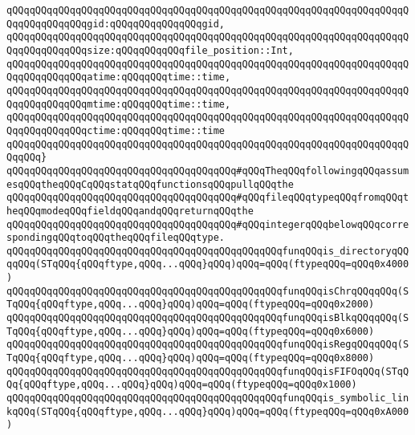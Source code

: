 \verb|qQQqqQQqqQQqqQQqqQQqqQQqqQQqqQQqqQQqqQQqqQQqqQQqqQQqqQQqqQQqqQQqqQQqqQQqqQQqqQQqqQQqgid:qQQqqQQqqQQqqQQqgid,|\newline
\verb|qQQqqQQqqQQqqQQqqQQqqQQqqQQqqQQqqQQqqQQqqQQqqQQqqQQqqQQqqQQqqQQqqQQqqQQqqQQqqQQqqQQqsize:qQQqqQQqqQQqfile_position::Int,|\newline
\verb|qQQqqQQqqQQqqQQqqQQqqQQqqQQqqQQqqQQqqQQqqQQqqQQqqQQqqQQqqQQqqQQqqQQqqQQqqQQqqQQqqQQqatime:qQQqqQQqtime::time,|\newline
\verb|qQQqqQQqqQQqqQQqqQQqqQQqqQQqqQQqqQQqqQQqqQQqqQQqqQQqqQQqqQQqqQQqqQQqqQQqqQQqqQQqqQQqmtime:qQQqqQQqtime::time,|\newline
\verb|qQQqqQQqqQQqqQQqqQQqqQQqqQQqqQQqqQQqqQQqqQQqqQQqqQQqqQQqqQQqqQQqqQQqqQQqqQQqqQQqqQQqctime:qQQqqQQqtime::time|\newline
\verb|qQQqqQQqqQQqqQQqqQQqqQQqqQQqqQQqqQQqqQQqqQQqqQQqqQQqqQQqqQQqqQQqqQQqqQQqqQQq}|\newline
\verb|qQQqqQQqqQQqqQQqqQQqqQQqqQQqqQQqqQQqqQQq#qQQqTheqQQqfollowingqQQqassumesqQQqtheqQQqCqQQqstatqQQqfunctionsqQQqpullqQQqthe|\newline
\verb|qQQqqQQqqQQqqQQqqQQqqQQqqQQqqQQqqQQqqQQq#qQQqfileqQQqtypeqQQqfromqQQqtheqQQqmodeqQQqfieldqQQqandqQQqreturnqQQqthe|\newline
\verb|qQQqqQQqqQQqqQQqqQQqqQQqqQQqqQQqqQQqqQQq#qQQqintegerqQQqbelowqQQqcorrespondingqQQqtoqQQqtheqQQqfileqQQqtype.|\newline
\newline
\verb|qQQqqQQqqQQqqQQqqQQqqQQqqQQqqQQqqQQqqQQqqQQqqQQqfunqQQqis_directoryqQQqqQQq(STqQQq{qQQqftype,qQQq...qQQq}qQQq)qQQq=qQQq(ftypeqQQq=qQQq0x4000)|\newline
\verb|qQQqqQQqqQQqqQQqqQQqqQQqqQQqqQQqqQQqqQQqqQQqqQQqfunqQQqisChrqQQqqQQq(STqQQq{qQQqftype,qQQq...qQQq}qQQq)qQQq=qQQq(ftypeqQQq=qQQq0x2000)|\newline
\verb|qQQqqQQqqQQqqQQqqQQqqQQqqQQqqQQqqQQqqQQqqQQqqQQqfunqQQqisBlkqQQqqQQq(STqQQq{qQQqftype,qQQq...qQQq}qQQq)qQQq=qQQq(ftypeqQQq=qQQq0x6000)|\newline
\verb|qQQqqQQqqQQqqQQqqQQqqQQqqQQqqQQqqQQqqQQqqQQqqQQqfunqQQqisRegqQQqqQQq(STqQQq{qQQqftype,qQQq...qQQq}qQQq)qQQq=qQQq(ftypeqQQq=qQQq0x8000)|\newline
\verb|qQQqqQQqqQQqqQQqqQQqqQQqqQQqqQQqqQQqqQQqqQQqqQQqfunqQQqisFIFOqQQq(STqQQq{qQQqftype,qQQq...qQQq}qQQq)qQQq=qQQq(ftypeqQQq=qQQq0x1000)|\newline
\verb|qQQqqQQqqQQqqQQqqQQqqQQqqQQqqQQqqQQqqQQqqQQqqQQqfunqQQqis_symbolic_linkqQQq(STqQQq{qQQqftype,qQQq...qQQq}qQQq)qQQq=qQQq(ftypeqQQq=qQQq0xA000)|\newline
